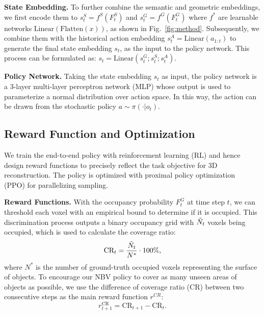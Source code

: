     \vspace{1pt}
    \noindent\textbf{State Embedding.}
    To further combine the semantic and geometric embeddings, we first encode them to $s^S_t=f^S(F^S_t)$ and $s^G_t=f^G(F^G_t)$ where $f^*$ are learnable networks $\mathrm{Linear}(\mathrm{Flatten}(x))$, as shown in Fig.~\ref{fig:method}. Subsequently, we combine them with the historical action embedding $s^A_t=\mathrm{Linear}(a_{1:t})$ to generate the final state embedding $s_t$, as the input to the policy network. This process can be formulated as: $s_t = \mathrm{Linear}(s^G_t; s^S_t; s^A_t)$.


    \vspace{1pt}
    \noindent\textbf{Policy Network.} Taking the state embedding $s_t$ as input, the policy network is a 3-layer multi-layer perceptron network (MLP) whose output is used to parameterize a normal distribution over action space. In this way, the action can be drawn from the stochastic policy $a \sim \pi(\cdot |o_t)$.


\subsection{Reward Function and Optimization}
\label{sec:method_reward}
    We train the end-to-end policy with reinforcement learning (RL) and hence design reward functions to precisely reflect the task objective for 3D reconstruction. The policy is optimized with proximal policy optimization~\cite{schulman2017proximal} (PPO) for parallelizing sampling.

     \vspace{1pt}
     \noindent\textbf{Reward Functions.}
     With the occupancy probability $F^G_t$ at time step $t$, we can threshold each voxel with an empirical bound to determine if it is occupied.
     This discrimination process outputs a binary occupancy grid with $\Tilde{N}_t$ voxels being occupied, which is used to calculate the coverage ratio: 
        \begin{equation}
        \text{CR}_t = \frac{\Tilde{N}_t}{N^*} \cdot 100\% ,
        \end{equation}
    where $N^*$ is the number of ground-truth occupied voxels representing the surface of objects.
    To encourage our NBV policy to cover as many unseen areas of objects as possible, we use the difference of coverage ratio (CR) between two consecutive steps as the main reward function $r^{CR}$:
    \begin{equation}
    r^\text{CR}_{t+1} = \text{CR}_{t+1} - \text{CR}_t.
    \end{equation}

